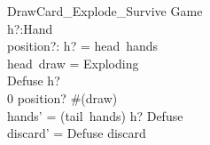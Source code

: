 \documentclass[11pt, fuzz]{article}
\begin{document}
\begin{schema}{DrawCard\_Explode\_Survive}
    \Delta Game \\
    h?:Hand \\
    position?: \nat
\where
    h? = head~hands \\
    head~draw = Exploding \\
    Defuse \inbag h? \\
    0 \leq position? \leq \#(draw)\\
    hands' = (tail~hands) \cat \langle h? \uminus \lbag Defuse \rbag \rangle\\
    discard' = \langle Defuse \rangle \cat discard \\
\end{schema}

\end{document}
